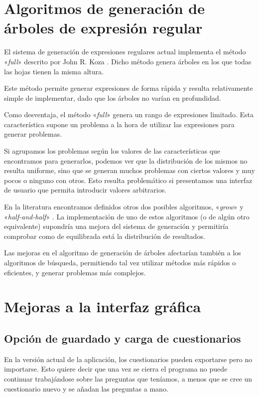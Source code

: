 
\section{Algoritmos de generación de árboles de expresión regular}
El sistema de generación de expresiones regulares actual implementa el método «\emph{full}» descrito por John R. Koza \cite{koza92}.
Dicho método genera árboles en los que todas las hojas tienen la misma altura.

Este método permite generar expresiones de forma rápida y resulta relativamente simple de implementar, dado que los árboles no varían en profundidad.

Como desventaja, el método «\emph{full}» genera un rango de expresiones limitado.
Esta característica supone un problema a la hora de utilizar las expresiones para generar problemas.

Si agrupamos los problemas según los valores de las características que encontramos para generarlos, podemos ver que la distribución de los mismos no resulta uniforme, sino que se generan muchos problemas con ciertos valores y muy pocos o ninguno con otros.
Esto resulta problemático si presentamos una interfaz de usuario que permita introducir valores arbitrarios.

En la literatura encontramos definidos otros dos posibles algoritmos, «\emph{grow}» y «\emph{half-and-half}» \cite{koza92}.
La implementación de uno de estos algoritmos (o de algún otro equivalente) supondría una mejora del sistema de generación y permitiría comprobar como de equilibrada está la distribución de resultados.

Las mejoras en el algoritmo de generación de árboles afectarían también a los algoritmos de búsqueda, permitiendo tal vez utilizar métodos más rápidos o eficientes, y generar problemas más complejos.

\section{Mejoras a la interfaz gráfica}
\subsection{Opción de guardado y carga de cuestionarios}
En la versión actual de la aplicación, los cuestionarios pueden exportarse pero no importarse.
Esto quiere decir que una vez se cierra el programa no puede continuar trabajándose sobre las preguntas que teníamos, a menos que se cree un cuestionario nuevo y se añadan las preguntas a mano.

